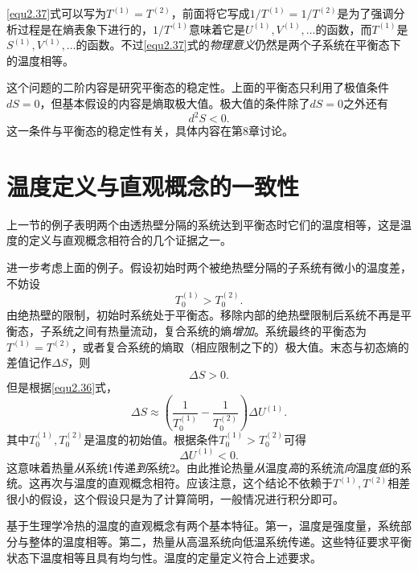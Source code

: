 \eqref{equ2.37}式可以写为$T^{(1)} = T^{(2)}$，前面将它写成$1 /T^{(1)} = 1 / T^{(2)}$是为了强调分析过程是在熵表象下进行的，$1 / T^{(1)}$意味着它是$U^{(1)}, V^{(1)}, \dots$的函数，而$T^{(1)}$是$S^{(1)}, V^{(1)}, \dots$的函数。不过\eqref{equ2.37}式的{\it 物理意义}仍然是两个子系统在平衡态下的温度相等。

这个问题的二阶内容是研究平衡态的稳定性。上面的平衡态只利用了极值条件$dS = 0$，但基本假设的内容是熵取极大值。极大值的条件除了$dS = 0$之外还有
\begin{equation}
\label{equ2.38}
	d^2 S < 0.
\end{equation}
这一条件与平衡态的稳定性有关，具体内容在第8章讨论。

\section{温度定义与直观概念的一致性}
\label{sec2.5}
上一节的例子表明两个由透热壁分隔的系统达到平衡态时它们的温度相等，这是温度的定义与直观概念相符合的几个证据之一。

进一步考虑上面的例子。假设初始时两个被绝热壁分隔的子系统有微小的温度差，不妨设
\begin{equation}
\label{equ2.39}
	T^{(1)}_0 > T^{(2)}_0.
\end{equation}
由绝热壁的限制，初始时系统处于平衡态。移除内部的绝热壁限制后系统不再是平衡态，子系统之间有热量流动，复合系统的熵{\it 增加}。系统最终的平衡态为$T^{(1)} = T^{(2)}$，或者复合系统的熵取（相应限制之下的）极大值。末态与初态熵的差值记作$\Delta S$，则 
\begin{equation}
\label{equ2.40}
	\Delta S > 0.
\end{equation}
但是根据\eqref{equ2.36}式，
\begin{equation}
\label{equ2.41}
	\Delta S \approx \left( \frac{1}{T^{(1)}_0 } - \frac{1}{T^{(2)}_0 } \right) \Delta U^{(1)}.
\end{equation}
其中$T^{(1)}_0, T^{(2)}_0$是温度的初始值。根据条件$T^{(1)}_0 > T^{(2)}_0$可得
\begin{equation}
\label{equ2.42}
	\Delta U^{(1)} < 0.
\end{equation}
这意味着热量{\it 从}系统1传递{\it 到}系统2。由此推论热量{\it 从}温度{\it 高}的系统流{\it 向}温度{\it 低}的系统。这再次与温度的直观概念相符。应该注意，这个结论不依赖于$T^{(1)}, T^{(2)}$相差很小的假设，这个假设只是为了计算简明，一般情况进行积分即可。

基于生理学冷热的温度的直观概念有两个基本特征。第一，温度是强度量，系统部分与整体的温度相等。第二，热量从高温系统向低温系统传递。这些特征要求平衡状态下温度相等且具有均匀性。温度的定量定义符合上述要求。


